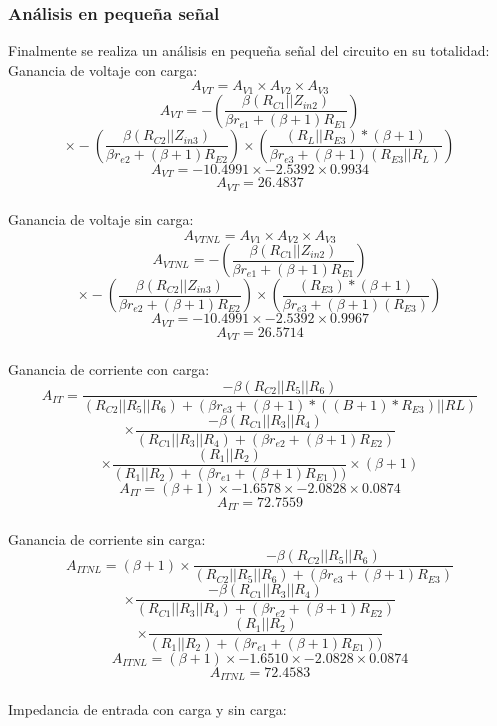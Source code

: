 \documentclass[conference]{IEEEtran}
\begin{document}
\subsubsection{Análisis en pequeña señal}
Finalmente se realiza un análisis en pequeña señal del circuito en su totalidad:\\

Ganancia de voltaje con carga:\\
\[ A_{VT} = A_{V1} \times A_{V2} \times A_{V3} \]
\[ A_{VT} = -(\frac{\beta(R_{C1}||Z_{in2})}{\beta r_{e1}+(\beta +1)R_{E1}})\]
\[\times-(\frac{\beta(R_{C2}||Z_{in3})}{\beta r_{e2}+(\beta +1)R_{E2}}) \times (\frac{(R_{L}||R_{E3})*(\beta+1)}{\beta r_{e3}+(\beta + 1)(R_{E3}||R_{L})}) \]
\[ A_{VT} = -10.4991 \times -2.5392 \times 0.9934 \]
\[\boxed{ A_{VT} = 26.4837 }\]\\

Ganancia de voltaje sin carga:\\
\[ A_{VTNL} = A_{V1} \times A_{V2} \times A_{V3} \]
\[ A_{VTNL} = -(\frac{\beta(R_{C1}||Z_{in2})}{\beta r_{e1}+(\beta +1)R_{E1}})\]
\[\times-(\frac{\beta(R_{C2}||Z_{in3})}{\beta r_{e2}+(\beta +1)R_{E2}}) \times (\frac{(R_{E3})*(\beta+1)}{\beta r_{e3}+(\beta + 1)(R_{E3})}) \]
\[ A_{VT} = -10.4991 \times -2.5392 \times 0.9967 \]
\[ \boxed{ A_{VT} = 26.5714} \]\\ 

Ganancia de corriente con carga:\\
\[ A_{IT} = \frac{-\beta(R_{C2}||R_{5}||R_{6})}{(R_{C2}||R_{5}||R_{6})+(\beta r_{e3}+(\beta + 1)*((B+1)*R_{E3})||RL)}\]
\[ \times \frac{-\beta(R_{C1}||R_{3}||R_{4})}{(R_{C1}||R_{3}||R_{4})+(\beta r_{e2}+(\beta + 1)R_{E2})} \]
\[ \times \frac{(R_{1}||R_{2})}{(R_{1}||R_{2})+(\beta r_{e1}+(\beta + 1)R_{E1}))} \times (\beta + 1) \]
\[ A_{IT} =  (\beta + 1) \times -1.6578 \times -2.0828 \times 0.0874 \]
\[ \boxed{ A_{IT} = 72.7559} \]\\ 

Ganancia de corriente sin carga:\\
\[ A_{ITNL} = (\beta + 1) \times \frac{-\beta(R_{C2}||R_{5}||R_{6})}{(R_{C2}||R_{5}||R_{6})+(\beta r_{e3}+(\beta + 1)R_{E3})}\]
\[ \times \frac{-\beta(R_{C1}||R_{3}||R_{4})}{(R_{C1}||R_{3}||R_{4})+(\beta r_{e2}+(\beta + 1)R_{E2})} \]
\[ \times \frac{(R_{1}||R_{2})}{(R_{1}||R_{2})+(\beta r_{e1}+(\beta + 1)R_{E1}))} \]
\[ A_{ITNL} =  (\beta + 1) \times -1.6510 \times -2.0828 \times 0.0874 \]
\[ \boxed{ A_{ITNL} = 72.4583} \]\\ 

Impedancia de entrada con carga y sin carga:
\end{document}
